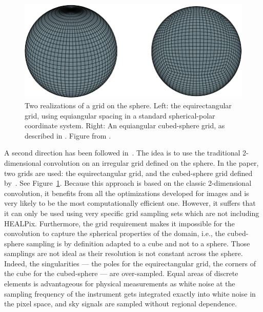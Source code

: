 \documentclass[final,twocolumn,3p,times,authoryear]{elsarticle}
\newcommand{\nati}[1]{{\color[rgb]{.1,.6,.1}{#1}}}
\newcommand{\figref}[1]{Figure~\ref{fig:#1}}
\newcommand{\1}{\b{1}}              %
\newcommand{\0}{\b{0}}              %
\begin{document}
\begin{figure}
	\centering
	\includegraphics[width=\linewidth]{sphere_grids}
	\caption{Two realizations of a grid on the sphere. Left: the equirectangular grid, using equiangular spacing in a standard spherical-polar coordinate system. Right: An equiangular cubed-sphere grid, as described in \citet{ronchi1996cubed}. Figure from \citet{boomsma2017spherical}.}
	\label{fig:sphere_grids}
\end{figure}

A second direction has been followed in~\citet{boomsma2017spherical}. The idea is
to use the traditional 2-dimensional convolution on an irregular grid defined on the
sphere. In the paper, two grids are used: the equirectangular grid, and the cubed-sphere grid defined by~\citet{ronchi1996cubed}. See \figref{sphere_grids}. Because this
approach is based on the classic 2-dimensional convolution, it benefits from all the optimizations developed for images and is very likely to be 
the most computationally efficient one. However, it suffers that it can only be used using very
specific grid sampling sets which are not including HEALPix. Furthermore, the
grid requirement makes it impossible for the convolution to capture the
spherical properties of the domain, i.e., the cubed-sphere sampling is by
definition adapted to a cube and not to a sphere.
Those samplings are not ideal as their resolution is not constant across the sphere. Indeed, the singularities --- the poles for the equirectangular grid, the corners of the cube for the cubed-sphere --- are over-sampled. Equal areas of discrete elements is advantageous for physical measurements as white noise at the sampling frequency of the instrument gets integrated exactly into white noise in the pixel space, and sky signals are sampled without regional dependence.
\end{document}
